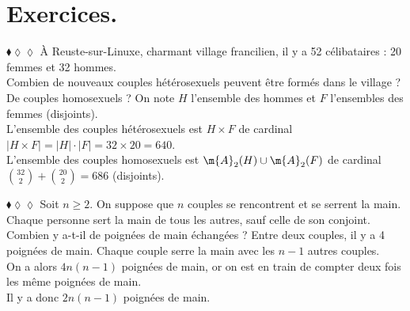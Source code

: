 \documentclass[11pt]{article}
\begin{document}
\section{Exercices.}

\begin{exercice}{$\blacklozenge\lozenge\lozenge$}{}
    À Reuste-sur-Linuxe, charmant village francilien, il y a 52 célibataires : 20 femmes et 32 hommes.\\
    Combien de nouveaux couples hétérosexuels peuvent être formés dans le village ? De couples homosexuels ?
    \tcblower
    On note $H$ l'ensemble des hommes et $F$ l'ensembles des femmes (disjoints).\\
    L'ensemble des couples hétérosexuels est $H\times F$ de cardinal $|H\times F|=|H|\cdot|F|=32\times20=640$.\\
    L'ensemble des couples homosexuels est $\m{A}_2(H)\cup\m{A}_2(F)$ de cardinal $\binom{32}{2}+\binom{20}{2}=686$ (disjoints).
\end{exercice}

\begin{exercice}{$\blacklozenge\lozenge\lozenge$}{}
    Soit $n\geq 2$. On suppose que $n$ couples se rencontrent et se serrent la main. Chaque personne sert la main de tous les autres, sauf celle de son conjoint. Combien y a-t-il de poignées de main échangées ?
    \tcblower
    Entre deux couples, il y a 4 poignées de main. Chaque couple serre la main avec les $n-1$ autres couples.\\
    On a alors $4n(n-1)$ poignées de main, or on est en train de compter deux fois les même poignées de main.\\
    Il y a donc $2n(n-1)$ poignées de main.
\end{exercice}
\end{document}
